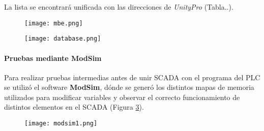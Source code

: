 La lista se encontrará unificada con las direcciones de \textit{UnityPro} (Tabla..).

\begin{figure}[h!]
	\centering
	\texttt{[image: mbe.png]}
	\label{fig:mbe}
\end{figure}
\begin{figure}[h!]
	\centering
	\texttt{[image: database.png]}
	\label{fig:database}
\end{figure}


\paragraph{Pruebas mediante ModSim}
Para realizar pruebas intermedias antes de unir SCADA con el programa del PLC se utilizó el software \textbf{ModSim}, dónde se generó los distintos mapas de memoria utilizados para modificar variables y observar el correcto funcionamiento de distintos elementos en el SCADA (Figura \ref{fig:modsim1}).

\begin{figure}[h!]
	\centering
	\texttt{[image: modsim1.png]}
	\label{fig:modsim1}
\end{figure}





